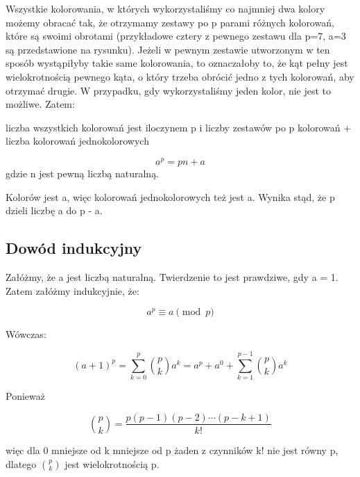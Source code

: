 \documentclass{article}
\begin{document}
Wszystkie kolorowania, w których wykorzystaliśmy co najmniej dwa kolory możemy obracać tak, że otrzymamy zestawy po p parami różnych kolorowań, które są swoimi obrotami (przykładowe cztery z pewnego zestawu dla p=7, a=3 są przedstawione na rysunku). Jeżeli w pewnym zestawie utworzonym w ten sposób wystąpiłyby takie same kolorowania, to oznaczałoby to, że kąt pełny jest wielokrotnością pewnego kąta, o który trzeba obrócić jedno z tych kolorowań, aby otrzymać drugie. W przypadku, gdy wykorzystaliśmy jeden kolor, nie jest to możliwe. Zatem: 

liczba wszystkich kolorowań jest iloczynem p i liczby zestawów po p kolorowań + liczba kolorowań jednokolorowych

\begin{displaymath}
	a^{p}=pn+a
\end{displaymath} 
gdzie n jest pewną liczbą naturalną.

Kolorów jest a, więc kolorowań jednokolorowych też jest a. Wynika stąd, że p dzieli liczbę a do p - a.

\subsection*{Dowód indukcyjny}
Załóżmy, że a jest liczbą naturalną. Twierdzenie to jest prawdziwe, gdy a = 1. Zatem załóżmy indukcyjnie, że:

\begin{equation}
	a^{p}\equiv a{\pmod {p}}
\end{equation}

Wówczas:

$$(a+1)^{p}=\sum _{k=0}^{p}{p \choose k}a^{k}=a^{p}+a^{0}+\sum _{k=1}^{p-1}{p \choose k}a^{k}$$

Ponieważ

$${p \choose k}={\frac {p(p-1)(p-2)\cdots (p-k+1)}{k!}}$$

więc dla 0 mniejsze od k mniejsze od p żaden z czynników k! nie jest równy p, dlatego $p \choose k$ jest wielokrotnością p.
\end{document}
